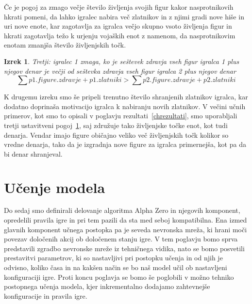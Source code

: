 \documentclass[a4paper, 12pt]{book}
\newtheorem{izrek}{Izrek}[chapter]
\begin{document}
Če je pogoj za zmago večje število življenja svojih figur kakor nasprotnikovih hkrati pomeni, da lahko igralec nabira več zlatnikov in z njimi gradi nove hiše in uri nove enote, kar zagotavlja za igralca večjo skupno vsoto življenja figur in hkrati zagotavlja težo k urjenju vojaških enot z namenom, da nasprotnikovim enotam zmanjša število življenjskih točk.

\begin{izrek}
	\label{ustavitvenipogoj3}
Tretji: igralec 1 zmaga, ko je seštevek zdravja vseh figur igralca 1 plus njegov denar je večji od seštevka zdravja vseh figur igralca 2 plus njegov denar
	\begin{equation}
	\sum{p1.figure.zdravje} + p1.zlatniki > \sum{p2.figure.zdravje} + p2.zlatniki
	\label{eq:ustavitvenipogoj3}
	\end{equation}
\end{izrek}

K drugemu izreku smo še pripeli trenutno število shranjenih zlatnikov igralca, kar dodatno doprinaša motivacijo igralca k nabiranju novih zlatnikov.
V večini učnih primerov, kot smo to opisali v poglavju rezultati~\ref{chrezultati}, smo uporabljali tretji ustavitveni pogoj~\ref{ustavitvenipogoj3}, saj združuje tako življenjske točke enot, kot tudi denarja.
Vendar imajo figure običajno veliko več življenjskih točk kolikor so vredne denarja, tako da je izgradnja nove figure za igralca primernejša, kot pa da bi denar shranjeval.


\chapter{Učenje modela}
\label{chucenjemodela}

Do sedaj smo definirali delovanje algoritma Alpha Zero in njegovih komponent, opredelili pravila igre in pri tem pazili da sta med seboj kompatibilna.
Ena izmed glavnih komponent učnega postopka pa je seveda nevronska mreža, ki hrani moči povezav določenih akcij ob določenem stanju igre.
V tem poglavju bomo sprva predstavili zgradbo nevronske mreže iz tehničnega vidika, nato se bomo posvetili prestavitvi parametrov, ki so nastavljivi pri postopku učenja in od njih je odvisno, koliko časa in na kakšen način se bo naš model učil ob nastavljeni konfiguraciji igre.
Proti koncu poglavja se bomo še poglobili v možno tehniko postopnega učenja modela, kjer inkrementalno dodajamo zahtevnejše konfiguracije in pravila igre.
\end{document}
